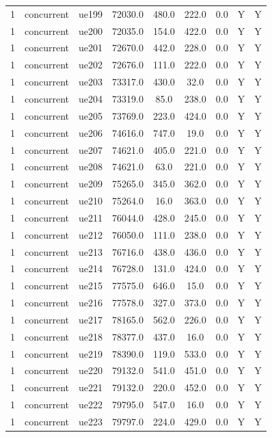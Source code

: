 \begin{table}[ht]
\begin{tabular}{|c|c|c|c|c|c|c|c|c|}
1 & concurrent & ue199 & 72030.0 & 480.0 & 222.0 & 0.0 & Y & Y \\
1 & concurrent & ue200 & 72035.0 & 154.0 & 422.0 & 0.0 & Y & Y \\
1 & concurrent & ue201 & 72670.0 & 442.0 & 228.0 & 0.0 & Y & Y \\
1 & concurrent & ue202 & 72676.0 & 111.0 & 222.0 & 0.0 & Y & Y \\
1 & concurrent & ue203 & 73317.0 & 430.0 & 32.0 & 0.0 & Y & Y \\
1 & concurrent & ue204 & 73319.0 & 85.0 & 238.0 & 0.0 & Y & Y \\
1 & concurrent & ue205 & 73769.0 & 223.0 & 424.0 & 0.0 & Y & Y \\
1 & concurrent & ue206 & 74616.0 & 747.0 & 19.0 & 0.0 & Y & Y \\
1 & concurrent & ue207 & 74621.0 & 405.0 & 221.0 & 0.0 & Y & Y \\
1 & concurrent & ue208 & 74621.0 & 63.0 & 221.0 & 0.0 & Y & Y \\
1 & concurrent & ue209 & 75265.0 & 345.0 & 362.0 & 0.0 & Y & Y \\
1 & concurrent & ue210 & 75264.0 & 16.0 & 363.0 & 0.0 & Y & Y \\
1 & concurrent & ue211 & 76044.0 & 428.0 & 245.0 & 0.0 & Y & Y \\
1 & concurrent & ue212 & 76050.0 & 111.0 & 238.0 & 0.0 & Y & Y \\
1 & concurrent & ue213 & 76716.0 & 438.0 & 436.0 & 0.0 & Y & Y \\
1 & concurrent & ue214 & 76728.0 & 131.0 & 424.0 & 0.0 & Y & Y \\
1 & concurrent & ue215 & 77575.0 & 646.0 & 15.0 & 0.0 & Y & Y \\
1 & concurrent & ue216 & 77578.0 & 327.0 & 373.0 & 0.0 & Y & Y \\
1 & concurrent & ue217 & 78165.0 & 562.0 & 226.0 & 0.0 & Y & Y \\
1 & concurrent & ue218 & 78377.0 & 437.0 & 16.0 & 0.0 & Y & Y \\
1 & concurrent & ue219 & 78390.0 & 119.0 & 533.0 & 0.0 & Y & Y \\
1 & concurrent & ue220 & 79132.0 & 541.0 & 451.0 & 0.0 & Y & Y \\
1 & concurrent & ue221 & 79132.0 & 220.0 & 452.0 & 0.0 & Y & Y \\
1 & concurrent & ue222 & 79795.0 & 547.0 & 16.0 & 0.0 & Y & Y \\
1 & concurrent & ue223 & 79797.0 & 224.0 & 429.0 & 0.0 & Y & Y \\

\end{tabular}
\end{table}
